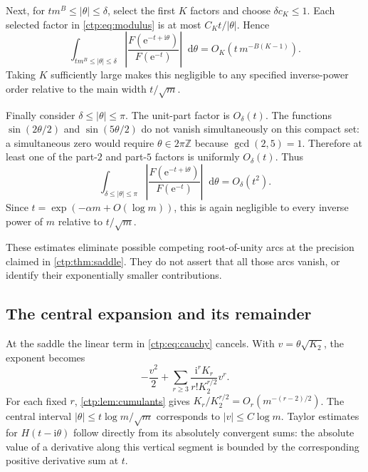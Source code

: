 \documentclass[11pt,a4paper]{article}
\numberwithin{equation}{section}
\theoremstyle{definition}
\theoremstyle{remark}
\newcommand{\Z}{\mathbb Z}
\newcommand{\ii}{\mathrm i}
\newcommand{\e}{\mathrm e}
\newcommand{\dd}{\mathop{}\!\mathrm d}
\begin{document}
Next, for $tm^B\leq|\theta|\leq\delta$, select the first $K$ factors and
choose $\delta c_K\leq1$. Each selected factor in \eqref{ctp:eq:modulus} is
at most $C_Kt/|\theta|$. Hence
\begin{equation}\label{ctp:eq:middle-bound}
 \int_{tm^B\leq|\theta|\leq\delta}
 \left|\frac{F(\e^{-t+\ii\theta})}{F(\e^{-t})}\right|\dd\theta
 =O_K\left(t\,m^{-B(K-1)}\right).
\end{equation}
Taking $K$ sufficiently large makes this negligible to any specified
inverse-power order relative to the main width $t/\sqrt m$.

Finally consider $\delta\leq|\theta|\leq\pi$. The unit-part factor is
$O_\delta(t)$. The functions $\sin(2\theta/2)$ and
$\sin(5\theta/2)$ do not vanish simultaneously on this compact set:
a simultaneous zero would require $\theta\in2\pi\Z$ because
$\gcd(2,5)=1$. Therefore at least one of the part-$2$ and part-$5$
factors is uniformly $O_\delta(t)$. Thus
\begin{equation}\label{ctp:eq:outer-bound}
 \int_{\delta\leq|\theta|\leq\pi}
 \left|\frac{F(\e^{-t+\ii\theta})}{F(\e^{-t})}\right|\dd\theta
 =O_\delta(t^2).
\end{equation}
Since $t=\exp(-\alpha m+O(\log m))$, this is again negligible to every
inverse power of $m$ relative to $t/\sqrt m$.

These estimates eliminate possible competing root-of-unity arcs at the
precision claimed in \cref{ctp:thm:saddle}. They do not assert that all those
arcs vanish, or identify their exponentially smaller contributions.

\subsection{The central expansion and its remainder}
At the saddle the linear term in \eqref{ctp:eq:cauchy} cancels. With
$v=\theta\sqrt{K_2}$, the exponent becomes
\begin{equation}\label{ctp:eq:central-exponent}
 -\frac{v^2}{2}+
 \sum_{r\geq3}\frac{\ii^rK_r}{r!K_2^{r/2}}v^r.
\end{equation}
For each fixed $r$, \cref{ctp:lem:cumulants} gives
$K_r/K_2^{r/2}=O_r(m^{-(r-2)/2})$. The central interval
$|\theta|\leq t\log m/\sqrt m$ corresponds to $|v|\leq C\log m$.
Taylor estimates for $H(t-\ii\theta)$ follow directly from its absolutely
convergent sums: the absolute value of a derivative along this vertical
segment is bounded by the corresponding positive derivative sum at $t$.
\end{document}

